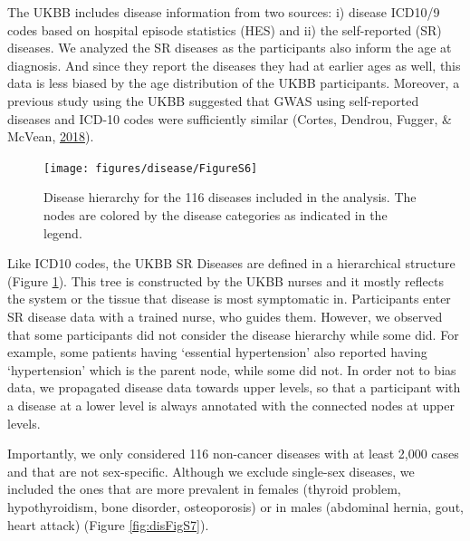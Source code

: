 \documentclass[12pt,twoside]{unicam}
\begin{document}
The UKBB includes disease information from two sources: i) disease ICD10/9 codes based on hospital episode statistics (HES) and ii) the self-reported (SR) diseases. We analyzed the SR diseases as the participants also inform the age at diagnosis. And since they report the diseases they had at earlier ages as well, this data is less biased by the age distribution of the UKBB participants. Moreover, a previous study using the UKBB suggested that GWAS using self-reported diseases and ICD-10 codes were sufficiently similar (Cortes, Dendrou, Fugger, \& McVean, \protect\hyperlink{ref-Cortes2018}{2018}).

\begin{figure}

{\centering \texttt{[image: figures/disease/FigureS6]} 

}

\caption[Disease hierarchy for the 116 diseases included in the analysis.]{Disease hierarchy for the 116 diseases included in the analysis. The nodes are colored by the disease categories as indicated in the legend.}\label{fig:disFigS6}
\end{figure}

Like ICD10 codes, the UKBB SR Diseases are defined in a hierarchical structure (Figure \ref{fig:disFigS6}). This tree is constructed by the UKBB nurses and it mostly reflects the system or the tissue that disease is most symptomatic in. Participants enter SR disease data with a trained nurse, who guides them. However, we observed that some participants did not consider the disease hierarchy while some did. For example, some patients having `essential hypertension' also reported having `hypertension' which is the parent node, while some did not. In order not to bias data, we propagated disease data towards upper levels, so that a participant with a disease at a lower level is always annotated with the connected nodes at upper levels.

Importantly, we only considered 116 non-cancer diseases with at least 2,000 cases and that are not sex-specific. Although we exclude single-sex diseases, we included the ones that are more prevalent in females (thyroid problem, hypothyroidism, bone disorder, osteoporosis) or in males (abdominal hernia, gout, heart attack) (Figure \ref{fig:disFigS7}).
\end{document}
